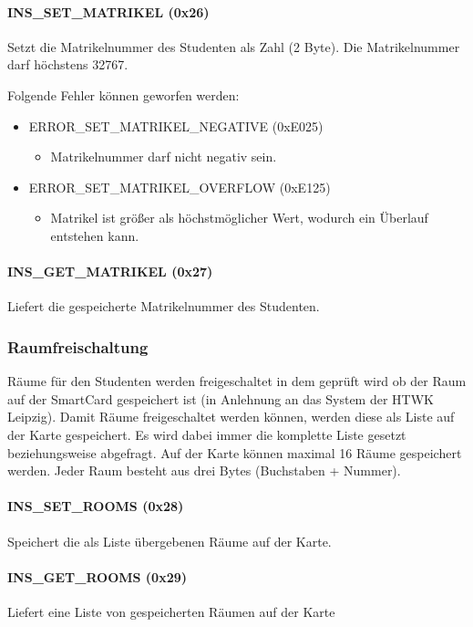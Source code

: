 \paragraph{INS\_SET\_MATRIKEL (0x26)}
Setzt die Matrikelnummer des Studenten als Zahl (2 Byte).
Die Matrikelnummer darf höchstens 32767.

Folgende Fehler können geworfen werden:
\begin{itemize}
	\item ERROR\_SET\_MATRIKEL\_NEGATIVE (0xE025)
	\begin{itemize}
		\item Matrikelnummer darf nicht negativ sein.
	\end{itemize}
	\item ERROR\_SET\_MATRIKEL\_OVERFLOW (0xE125)
	\begin{itemize}
		\item Matrikel ist größer als höchstmöglicher Wert, wodurch ein Überlauf entstehen kann.
	\end{itemize}
\end{itemize}

\paragraph{INS\_GET\_MATRIKEL (0x27)}
Liefert die gespeicherte Matrikelnummer des Studenten.

\subsubsection{Raumfreischaltung}
Räume für den Studenten werden freigeschaltet in dem geprüft wird ob der Raum auf der SmartCard gespeichert ist (in Anlehnung an das System der HTWK Leipzig).
Damit Räume freigeschaltet werden können, werden diese als Liste auf der Karte gespeichert.
Es wird dabei immer die komplette Liste gesetzt beziehungsweise abgefragt.
Auf der Karte können maximal 16 Räume gespeichert werden.
Jeder Raum besteht aus drei Bytes (Buchstaben + Nummer).

\paragraph{INS\_SET\_ROOMS (0x28)}
Speichert die als Liste übergebenen Räume auf der Karte.
\paragraph{INS\_GET\_ROOMS (0x29)}
Liefert eine Liste von gespeicherten Räumen auf der Karte

